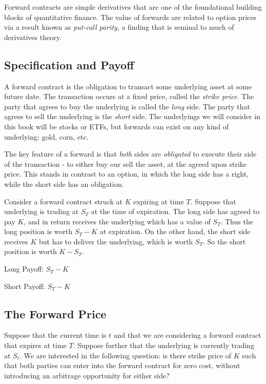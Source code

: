 \documentclass[11pt,]{krantz}
\begin{document}
Forward contracts are simple derivatives that are one of the foundational building blocks of quantitative finance. The value of forwards are related to option prices via a result known as \emph{put-call parity}, a finding that is seminal to much of derivatives theory.

\subsection{Specification and Payoff}\label{specification-and-payoff}

A forward contract is the obligation to transact some underlying asset at some future date. The transaction occurs at a fixed price, called the \emph{strike price}. The party that agrees to buy the underlying is called the \emph{long} side. The party that agrees to sell the underlying is the \emph{short} side. The underlyings we will consider in this book will be stocks or ETFs, but forwards can exist on any kind of underlying: gold, corn, etc.

The key feature of a forward is that \emph{both} sides are \emph{obligated} to execute their side of the transaction - to either buy our sell the asset, at the agreed upon strike price. This stands in contrast to an option, in which the long side has a right, while the short side has an obligation.

Consider a forward contract struck at \(K\) expiring at time \(T\). Suppose that underlying is trading at \(S_{T}\) at the time of expiration. The long side has agreed to pay \(K\), and in return receives the underlying which has a value of \(S_{T}\). Thus the long position is worth \(S_{T} - K\) at expiration. On the other hand, the short side receives \(K\) but has to deliver the underlying, which is worth \(S_{T}\). So the short position is worth \(K - S_{T}\).

Long Payoff: \(S_{T} - K\)

Short Payoff: \(S_{T} - K\)

\subsection{The Forward Price}\label{the-forward-price}

Suppose that the current time is \(t\) and that we are considering a forward contract that expires at time \(T\). Suppose further that the underlying is currently trading at \(S_{t}\). We are interested in the following question: is there strike price of \(K\) such that both parties can enter into the forward contract for zero cost, without introducing an arbitrage opportunity for either side?
\end{document}
